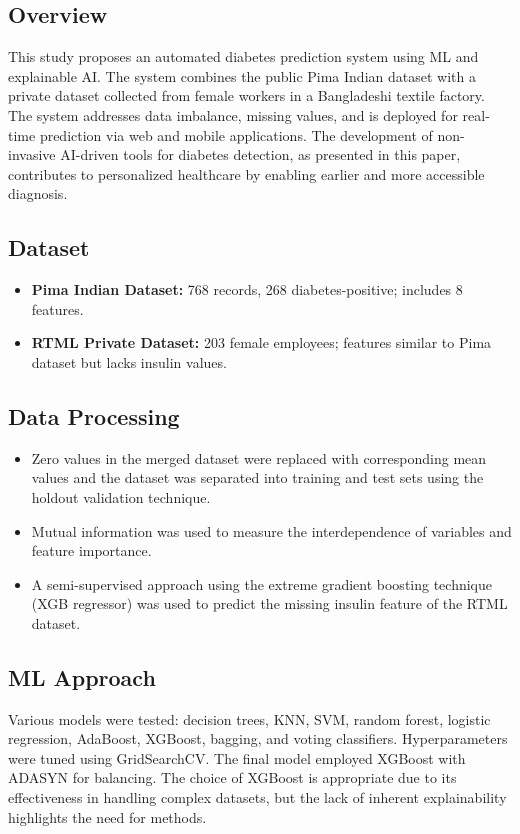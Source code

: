 \subsection*{Overview}
This study proposes an automated diabetes prediction system using ML and explainable AI. The system combines the public Pima Indian dataset with a private dataset collected from female workers in a Bangladeshi textile factory. The system addresses data imbalance, missing values, and is deployed for real-time prediction via web and mobile applications. The development of non-invasive AI-driven tools for diabetes detection, as presented in this paper, contributes to personalized healthcare by enabling earlier and more accessible diagnosis.

\subsection*{Dataset}
\begin{itemize}
    \item \textbf{Pima Indian Dataset:} 768 records, 268 diabetes-positive; includes 8 features.
    \item \textbf{RTML Private Dataset:} 203 female employees; features similar to Pima dataset but lacks insulin values.
\end{itemize}

\subsection*{Data Processing}
\begin{itemize}
    \item Zero values in the merged dataset were replaced with corresponding mean values and the dataset was separated into training and test sets using the holdout validation technique.
    \item Mutual information was used to measure the interdependence of variables and feature importance.
    \item A semi-supervised approach using the extreme gradient boosting technique (XGB regressor) was used to predict the missing insulin feature of the RTML dataset.
\end{itemize}

\subsection*{ML Approach}
Various models were tested: decision trees, KNN, SVM, random forest, logistic regression, AdaBoost, XGBoost, bagging, and voting classifiers. Hyperparameters were tuned using GridSearchCV. The final model employed XGBoost with ADASYN for balancing. The choice of XGBoost is appropriate due to its effectiveness in handling complex datasets, but the lack of inherent explainability highlights the need for methods.

